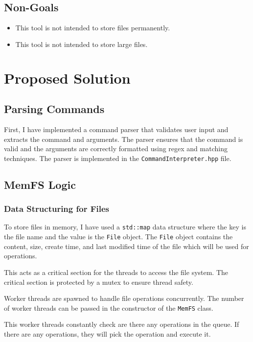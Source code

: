 \documentclass{article}
\begin{document}
\subsection{Non-Goals}
\begin{itemize}
      \item This tool is not intended to store files permanently.
      \item This tool is not intended to store large files.
\end{itemize}

\section{Proposed Solution}

\subsection{Parsing Commands}
First, I have implemented a command parser that validates user input and extracts the command and arguments. The parser ensures that the command is valid and the arguments are correctly formatted using regex and matching techniques. The parser is implemented in the \texttt{CommandInterpreter.hpp} file.


\subsection{MemFS Logic}

\subsubsection{Data Structuring for Files}
To store files in memory, I have used a \texttt{std::map} data structure where the key is the file name and the value is the \texttt{File} object. The \texttt{File} object contains the content, size, create time, and last modified time of the file which will be used for operations.

\noindent This acts as a critical section for the threads to access the file system. The critical section is protected by a mutex to ensure thread safety.

\noindent Worker threads are spawned to handle file operations concurrently. The number of worker threads can be passed in the constructor of the \texttt{MemFS} class.

\noindent This worker threads constantly check are there any operations in the queue. If there are any operations, they will pick the operation and execute it.
\end{document}
